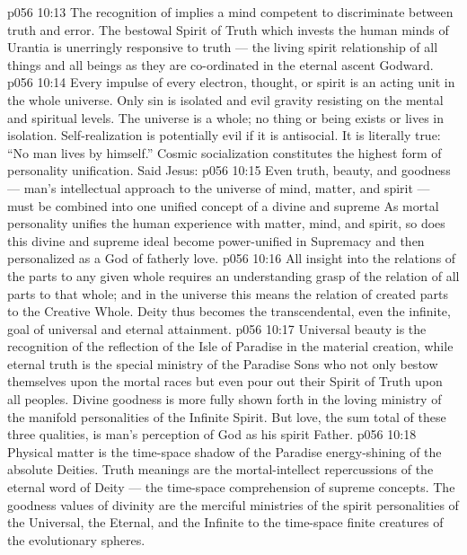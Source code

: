\vs p056 10:13 \pc The recognition of  implies a mind competent to discriminate between truth and error. The bestowal Spirit of Truth which invests the human minds of Urantia is unerringly responsive to truth --- the living spirit relationship of all things and all beings as they are co\hyp{}ordinated in the eternal ascent Godward.
\vs p056 10:14 Every impulse of every electron, thought, or spirit is an acting unit in the whole universe. Only sin is isolated and evil gravity resisting on the mental and spiritual levels. The universe is a whole; no thing or being exists or lives in isolation. Self\hyp{}realization is potentially evil if it is antisocial. It is literally true: “No man lives by himself.” Cosmic socialization constitutes the highest form of personality unification. Said Jesus: 
\vs p056 10:15 Even truth, beauty, and goodness --- man’s intellectual approach to the universe of mind, matter, and spirit --- must be combined into one unified concept of a divine and supreme  As mortal personality unifies the human experience with matter, mind, and spirit, so does this divine and supreme ideal become power\hyp{}unified in Supremacy and then personalized as a God of fatherly love.
\vs p056 10:16 All insight into the relations of the parts to any given whole requires an understanding grasp of the relation of all parts to that whole; and in the universe this means the relation of created parts to the Creative Whole. Deity thus becomes the transcendental, even the infinite, goal of universal and eternal attainment.
\vs p056 10:17 \pc Universal beauty is the recognition of the reflection of the Isle of Paradise in the material creation, while eternal truth is the special ministry of the Paradise Sons who not only bestow themselves upon the mortal races but even pour out their Spirit of Truth upon all peoples. Divine goodness is more fully shown forth in the loving ministry of the manifold personalities of the Infinite Spirit. But love, the sum total of these three qualities, is man’s perception of God as his spirit Father.
\vs p056 10:18 Physical matter is the time\hyp{}space shadow of the Paradise energy\hyp{}shining of the absolute Deities. Truth meanings are the mortal\hyp{}intellect repercussions of the eternal word of Deity --- the time\hyp{}space comprehension of supreme concepts. The goodness values of divinity are the merciful ministries of the spirit personalities of the Universal, the Eternal, and the Infinite to the time\hyp{}space finite creatures of the evolutionary spheres.

